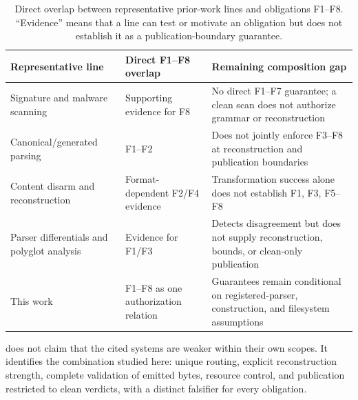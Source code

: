 \begin{table}[t]
\centering
\caption{Direct overlap between representative prior-work lines and obligations
F1--F8. ``Evidence'' means that a line can test or motivate an obligation but
does not establish it as a publication-boundary guarantee.}
\label{tab:research-position}
\small
\begin{tabularx}{\textwidth}{L{0.27\textwidth}L{0.20\textwidth}Y}
\toprule
Representative line & Direct F1--F8 overlap & Remaining composition gap \\
\midrule
Signature and malware scanning \cite{nist80083} & Supporting evidence for F8 & No direct F1--F7 guarantee; a clean scan does not authorize grammar or reconstruction \\
Canonical/generated parsing \cite{samuel2012,nail2014,everparse2019,ipg2023} & F1--F2 & Does not jointly enforce F3--F8 at reconstruction and publication boundaries \\
Content disarm and reconstruction \cite{darpaSafeDocs,belkind2023,dubin2023,dubin2024ole} & Format-dependent F2/F4 evidence & Transformation success alone does not establish F1, F3, F5--F8 \\
Parser differentials and polyglot analysis \cite{jana2012,koch2025,you2025} & Evidence for F1/F3 & Detects disagreement but does not supply reconstruction, bounds, or clean-only publication \\
This work & F1--F8 as one authorization relation & Guarantees remain conditional on registered-parser, construction, and filesystem assumptions \\
\bottomrule
\end{tabularx}
\end{table}

 does not claim that the cited systems are weaker
within their own scopes. It identifies the combination studied here: unique
routing, explicit reconstruction strength, complete validation of emitted
bytes, resource control, and publication restricted to clean verdicts, with a
distinct falsifier for every obligation.
